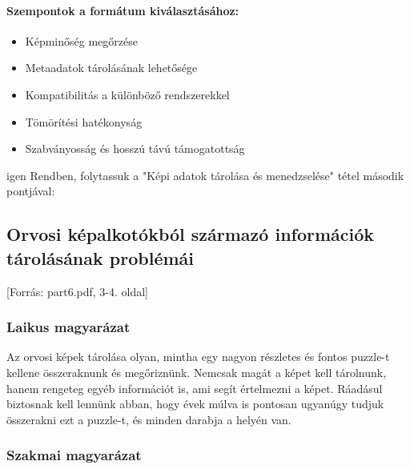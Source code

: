 \documentclass[a4paper,12pt]{article}
\begin{document}
\paragraph{Szempontok a formátum kiválasztásához:} \begin{itemize} \item Képminőség megőrzése \item Metaadatok tárolásának lehetősége \item Kompatibilitás a különböző rendszerekkel \item Tömörítési hatékonyság \item Szabványosság és hosszú távú támogatottság \end{itemize}

igen
Rendben, folytassuk a "Képi adatok tárolása és menedzselése" tétel második pontjával:

\subsection{Orvosi képalkotókból származó információk tárolásának problémái} [Forrás: part6.pdf, 3-4. oldal]

\subsubsection{Laikus magyarázat} Az orvosi képek tárolása olyan, mintha egy nagyon részletes és fontos puzzle-t kellene összeraknunk és megőriznünk. Nemcsak magát a képet kell tárolnunk, hanem rengeteg egyéb információt is, ami segít értelmezni a képet. Ráadásul biztosnak kell lennünk abban, hogy évek múlva is pontosan ugyanúgy tudjuk összerakni ezt a puzzle-t, és minden darabja a helyén van.

\subsubsection{Szakmai magyarázat}
\end{document}
